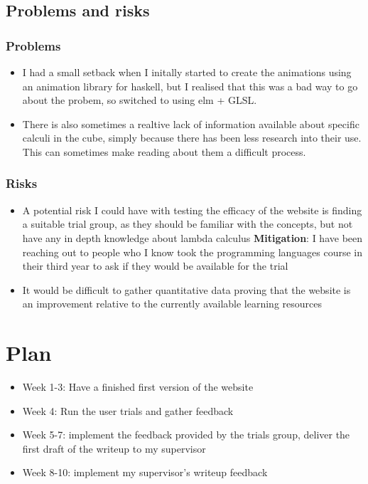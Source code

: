\documentclass[11pt]{article}
\begin{document}
\subsection{Problems and risks}\label{problems-and-risks}

\subsubsection{Problems}\label{problems}

\begin{itemize}
    \tightlist
\item I had a small setback when I initally started to create the animations
using an animation library for haskell, but I realised that this was a bad 
way to go about the probem, so switched to using elm + GLSL.
\item There is also sometimes a realtive lack of information available about
specific calculi in the cube, simply because there has been less research into
their use.  This can sometimes make reading about them a difficult process.

\end{itemize}

\subsubsection{Risks}\label{risks}

\begin{itemize}
    \tightlist
\item A potential risk I could have with testing the efficacy of the website is
finding a suitable trial group, as they should be familiar with the concepts, but not
have any in depth knowledge about lambda calculus \textbf{Mitigation}: I have been reaching 
out to people who I know took the programming languages course in their third year to ask if 
they would be available for the trial
\item It would be difficult to gather quantitative data proving that the website is
an improvement relative to the currently available learning resources

\end{itemize}

\section{Plan}\label{plan}

\begin{itemize}
    \tightlist
    \item
      Week 1-3: Have a finished first version of the website
    \item
      Week 4: Run the user trials and gather feedback
    \item
      Week 5-7: implement the feedback provided by the trials group, deliver the first draft of the writeup to my supervisor
    \item
      Week 8-10: implement my supervisor's writeup feedback
    \end{itemize}
    
\end{document}
